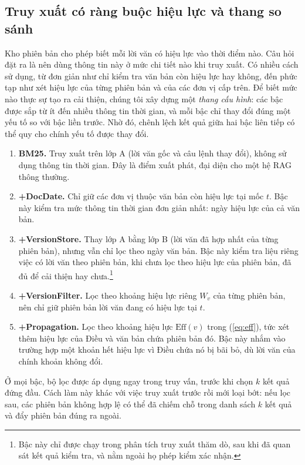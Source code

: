 \documentclass[11pt,a4paper]{article}
\begin{document}
\subsection{Truy xuất có ràng buộc hiệu lực và thang so sánh}
Kho phiên bản cho phép biết mỗi lời văn có hiệu lực vào thời điểm nào. Câu hỏi đặt ra là nên dùng thông tin này ở mức chi tiết nào khi truy xuất. Có nhiều cách sử dụng, từ đơn giản như chỉ kiểm tra văn bản còn hiệu lực hay không, đến phức tạp như xét hiệu lực của từng phiên bản và của các đơn vị cấp trên. Để biết mức nào thực sự tạo ra cải thiện, chúng tôi xây dựng một \emph{thang cấu hình}: các bậc được sắp từ ít đến nhiều thông tin thời gian, và mỗi bậc chỉ thay đổi đúng một yếu tố so với bậc liền trước. Nhờ đó, chênh lệch kết quả giữa hai bậc liên tiếp có thể quy cho chính yếu tố được thay đổi.

\begin{enumerate}
  \item \textbf{BM25.} Truy xuất trên lớp A (lời văn gốc và câu lệnh thay đổi), không sử dụng thông tin thời gian. Đây là điểm xuất phát, đại diện cho một hệ RAG thông thường.
  \item \textbf{+DocDate.} Chỉ giữ các đơn vị thuộc văn bản còn hiệu lực tại mốc $t$. Bậc này kiểm tra mức thông tin thời gian đơn giản nhất: ngày hiệu lực của cả văn bản.
  \item \textbf{+VersionStore.} Thay lớp A bằng lớp B (lời văn đã hợp nhất của từng phiên bản), nhưng vẫn chỉ lọc theo ngày văn bản. Bậc này kiểm tra liệu riêng việc có lời văn theo phiên bản, khi chưa lọc theo hiệu lực của phiên bản, đã đủ để cải thiện hay chưa.\footnote{Bậc này chỉ được chạy trong phân tích truy xuất thăm dò, sau khi đã quan sát kết quả kiểm tra, và nằm ngoài họ phép kiểm xác nhận.}
  \item \textbf{+VersionFilter.} Lọc theo khoảng hiệu lực riêng $W_v$ của từng phiên bản, nên chỉ giữ phiên bản lời văn đang có hiệu lực tại $t$.
  \item \textbf{+Propagation.} Lọc theo khoảng hiệu lực $\mathrm{Eff}(v)$ trong (\ref{eq:eff}), tức xét thêm hiệu lực của Điều và văn bản chứa phiên bản đó. Bậc này nhắm vào trường hợp một khoản hết hiệu lực vì Điều chứa nó bị bãi bỏ, dù lời văn của chính khoản không đổi.
\end{enumerate}

Ở mọi bậc, bộ lọc được áp dụng ngay trong truy vấn, trước khi chọn $k$ kết quả đứng đầu. Cách làm này khác với việc truy xuất trước rồi mới loại bớt: nếu lọc sau, các phiên bản không hợp lệ có thể đã chiếm chỗ trong danh sách $k$ kết quả và đẩy phiên bản đúng ra ngoài.
\end{document}
